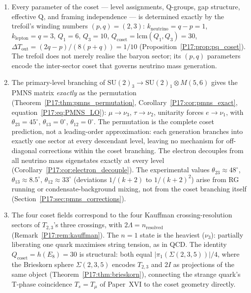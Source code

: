 \documentclass[11pt,a4paper]{article}
\theoremstyle{definition}\newtheorem{definition}[theorem]{Definition}
\theoremstyle{remark}
\newcommand{\SU}{\mathrm{SU}}
\newcommand{\twoI}{2I}
\begin{document}
\begin{enumerate}[noitemsep]
  separated by the outer gap $\Delta T=1/10$, gives
  $m_{\nu_3}/m_{\nu_2}=\exp(4\pi^2/10\sqrt{5})\approx5.845$ at
  $Q_{\mathrm{eff}}=2\pi/\sqrt{5}$, matching the experimental
  value $5.795$ to $0.9\%$ (Proposition~\ref{P17:prop:nu_mass_ratio}).
  The value $Q_{\mathrm{eff}}=2\pi/\sqrt{k+2}$ is uniquely forced
  by bosonic monodromy (irrationality) and S-matrix unitarity
  (Proposition~\ref{P17:prop:Qeff_unique}, Theorem~\ref{P17:thm:Qeff_derived}).
  The inner gap $\Delta T_{\mathrm{in}}=2/5=4\,\Delta T_{\mathrm{out}}$
  predicts $m_{\nu_1}\approx0.007\,\mathrm{meV}$
  (Remark~\ref{P17:rem:m1_suppressed}).
\item Every parameter of the coset --- level assignments,
  Q-groups, gap structure, effective Q, and framing independence ---
  is determined exactly by the trefoil's winding numbers $(p,q)=(2,3)$:
  $k_{\mathrm{neutrino}}=q-p=1$, $k_{\mathrm{lepton}}=q=3$,
  $Q_1=6$, $Q_3=10$, $Q_{\mathrm{coset}}=\mathrm{lcm}(Q_1,Q_3)=30$,
  $\Delta T_{\mathrm{out}}=(2q-p)/(8(p+q))=1/10$
  (Proposition~\ref{P17:prop:pq_coset}). The trefoil does not merely
  realise the baryon sector; its $(p,q)$ parameters encode the
  inter-sector coset that governs neutrino mass generation.
\item The primary-level branching of $\SU(2)_3\to\SU(2)_1\otimes M(5,6)$
  gives the PMNS matrix \emph{exactly} as the permutation
  (Theorem~\ref{P17:thm:pmns_permutation}, Corollary~\ref{P17:cor:pmns_exact},
  equation~\eqref{P17:eq:PMNS_LO}): $\mu\to\nu_3$, $\tau\to\nu_2$,
  unitarity forces $e\to\nu_1$, with
  $\theta_{23}=45^\circ$, $\theta_{13}=0^\circ$, $\theta_{12}=0^\circ$.
  The permutation is the complete coset prediction, not a leading-order
  approximation: each generation branches into exactly one sector at
  every descendant level, leaving no mechanism for off-diagonal
  corrections within the coset branching.
  The electron decouples from all neutrino mass eigenstates exactly at
  every level (Corollary~\ref{P17:cor:electron_decouple}).
  The experimental values $\theta_{23}\approx48^\circ$,
  $\theta_{13}\approx8.5^\circ$, $\theta_{12}\approx33^\circ$
  (deviations $1/(k+2)$ to $1/(k+2)^2$) arise from RG running
  or condensate-background mixing, not from the coset branching itself
  (Section~\ref{P17:sec:pmns_corrections}).
\item The four coset fields correspond to the four Kauffman
  crossing-resolution sectors of $T_{2,3}$'s three crossings,
  with $2\Lambda=n_{\mathrm{resolved}}$ (Remark~\ref{P17:rem:kauffman}).
  The $n=1$ state is the heaviest ($\nu_3$): partially liberating
  one quark maximises string tension, as in QCD.  The identity
  $Q_{\mathrm{coset}}=h(E_8)=30$ is structural: both equal
  $|\pi_1(\Sigma(2,3,5))|/4$, where the Brieskorn sphere
  $\Sigma(2,3,5)$ encodes $T_{2,3}$ and $\twoI$ as projections of
  the same object (Theorem~\ref{P17:thm:brieskorn}), connecting the
  strange quark's T-phase coincidence $T_s=T_\mu$ of Paper~XVI
  to the coset geometry directly.
\end{enumerate}
\end{document}
